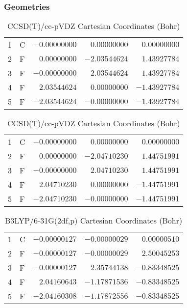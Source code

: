\documentclass[10pt,oneside]{article}
\begin{document}
\begin{table}[h!]
\subsubsection*{Geometries}
\begin{multicols}{2}
\centering
\caption{CCSD(T)/cc-pVTZ Cartesian Coordinates (Bohr)}
\begin{tabular}{llrrr}
\toprule
1  & C  & $-0.00000000$ & $ 0.00000000$ & $ 0.00000000$ \\
2  & F  & $ 0.00000000$ & $-2.03544624$ & $ 1.43927784$ \\
3  & F  & $-0.00000000$ & $ 2.03544624$ & $ 1.43927784$ \\
4  & F  & $ 2.03544624$ & $ 0.00000000$ & $-1.43927784$ \\
5  & F  & $-2.03544624$ & $-0.00000000$ & $-1.43927784$ \\
\bottomrule
\end{tabular}
\caption{CCSD(T)/cc-pVDZ Cartesian Coordinates (Bohr)}
\begin{tabular}{llrrr}
\toprule
1  & C  & $-0.00000000$ & $ 0.00000000$ & $ 0.00000000$ \\
2  & F  & $ 0.00000000$ & $-2.04710230$ & $ 1.44751991$ \\
3  & F  & $-0.00000000$ & $ 2.04710230$ & $ 1.44751991$ \\
4  & F  & $ 2.04710230$ & $ 0.00000000$ & $-1.44751991$ \\
5  & F  & $-2.04710230$ & $-0.00000000$ & $-1.44751991$ \\
\bottomrule
\end{tabular}
\end{multicols}
\end{table}

\begin{table}[h]
\centering
\caption{B3LYP/6-31G(2df,p) Cartesian Coordinates (Bohr)}
\begin{tabular}{llrrr}
\toprule
1  & C  & $-0.00000127$ & $-0.00000029$ & $ 0.00000510$ \\
2  & F  & $-0.00000127$ & $-0.00000029$ & $ 2.50045253$ \\
3  & F  & $-0.00000127$ & $ 2.35744138$ & $-0.83348525$ \\
4  & F  & $ 2.04160643$ & $-1.17871536$ & $-0.83348525$ \\
5  & F  & $-2.04160308$ & $-1.17872556$ & $-0.83348525$ \\
\bottomrule
\end{tabular}
\end{table}
\end{document}

